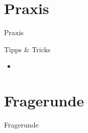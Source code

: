 \documentclass[xcolor=dvipsnames]{beamer}
\begin{document}
    \section{Praxis}
    {
        \begin{frame}
            \begin{center}
                \Huge Praxis
            \end{center}
        \end{frame}
    }

    \begin{frame}{Tipps \& Tricks}
        \begin{itemize}
            \setlength\itemsep{1em}
            \item
        \end{itemize}
    \end{frame}

    \section{Fragerunde}
    {
        \begin{frame}
            \begin{center}
                \Huge Fragerunde
            \end{center}
        \end{frame}
    }
\end{document}
